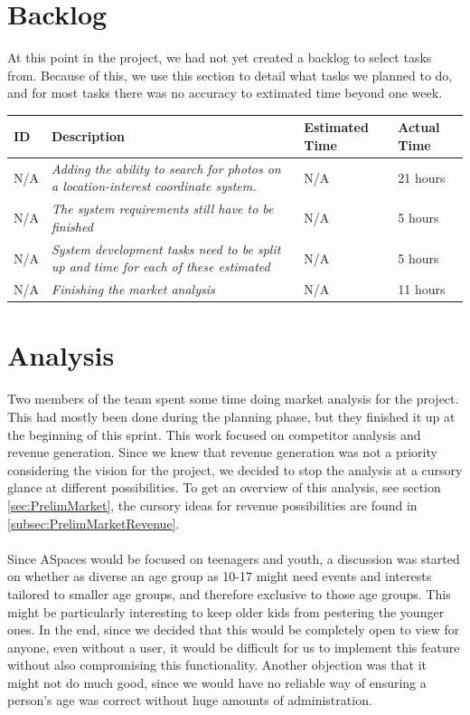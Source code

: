 \section{Backlog}
\label{sec:S1Backlog}
At this point in the project, we had not yet created a backlog to select tasks from. Because of this, we use this section to detail what tasks we planned to do, and for most tasks there was no accuracy to extimated time beyond one week. \\
\begin{minipage}{\linewidth}
\setlength{\tabcolsep}{12pt}
\centering
{}
\begin{tabular}{|p{1cm}|p{4cm}|p{2cm}|p{2cm}|}
\hline
\cellcolor{gray!25} ID & \cellcolor{gray!25} Description & \cellcolor{gray!25} Estimated Time & \cellcolor{gray!25} Actual Time \\
\hline
N/A & \it{Adding the ability to search for photos on a location-interest coordinate system.} & N/A & 21 hours \\
N/A & \it{The system requirements still have to be finished} & N/A & 5 hours \\
N/A & \it{System development tasks need to be split up and time for each of these estimated} & N/A & 5 hours \\
N/A & \it{Finishing the market analysis} & N/A & 11 hours \\
\hline
\end{tabular}
\end{minipage}

\section{Analysis}
\label{sec:S1Analysis}
Two members of the team spent some time doing market analysis for the project. This had mostly been done during the planning phase, but they finished it up at the beginning of this sprint. This work focused on competitor analysis and revenue generation. Since we knew that revenue generation was not a priority considering the vision for the project, we decided to stop the analysis at a cursory glance at different possibilities. To get an overview of this analysis, see section \ref{sec:PrelimMarket}, the cursory ideas for revenue possibilities are found in \ref{subsec:PrelimMarketRevenue}.

\paragraph{} Since ASpaces would be focused on teenagers and youth, a discussion was started on whether as diverse an age group as 10-17 might need events and interests tailored to smaller age groups, and therefore exclusive to those age groups. This might be particularly interesting to keep older kids from pestering the younger ones. In the end, since we decided that this would be completely open to view for anyone, even without a user, it would be difficult for us to implement this feature without also compromising this functionality. Another objection was that it might not do much good, since we would have no reliable way of ensuring a person's age was correct without huge amounts of administration.

